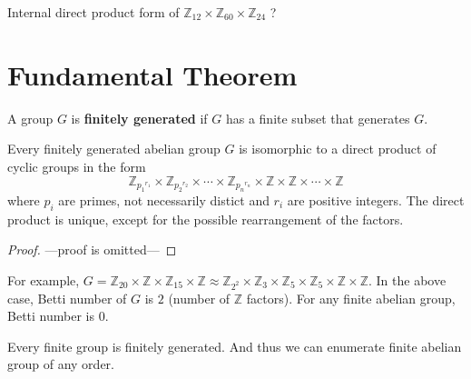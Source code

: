 \begin{question}
	Internal direct product form of $\mathbb{Z}_{12} \times \mathbb{Z}_{60} \times \mathbb{Z}_{24}$ ?
\end{question}

\section{Fundamental Theorem}
\begin{definition}
	A group $G$ is \textbf{finitely generated} if $G$ has a finite subset that generates $G$.
\end{definition}

\begin{theorem}
	Every finitely generated abelian group $G$ is isomorphic to a direct product of cyclic groups in the form
	\begin{equation}
		\mathbb{Z}_{{p_1}^{r_1}} \times\mathbb{Z}_{{p_2}^{r_2}} \times \cdots \times \mathbb{Z}_{{p_n}^{r_n}} \times \mathbb{Z} \times \mathbb{Z} \times \cdots \times \mathbb{Z}
	\end{equation}
	where $p_i$ are primes, not necessarily distict and $r_i$ are positive integers.
	The direct product is unique, except for the possible rearrangement of the factors.
\end{theorem}
\begin{proof}
	---proof is omitted---
\end{proof}

For example, $ G = \mathbb{Z}_{20} \times \mathbb{Z} \times \mathbb{Z}_{15} \times \mathbb{Z} \approx \mathbb{Z}_{2^2} \times \mathbb{Z}_3 \times \mathbb{Z}_5 \times \mathbb{Z}_5 \times \mathbb{Z} \times \mathbb{Z}$.
In the above case, Betti number of $G$ is $2$ (number of $\mathbb{Z}$ factors).
For any finite abelian group, Betti number is $0$.

\begin{remark}
	Every finite group is finitely generated.
	And thus we can enumerate finite abelian group of any order.
\end{remark}

